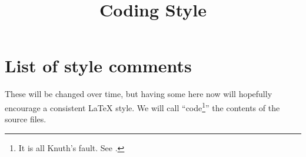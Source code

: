 

%


\title{Coding Style}


\maketitle

\tableofcontents

\section{List of style comments}
\label{section-style}

\noindent
These will be changed over time, but having some here now
will hopefully encourage a consistent LaTeX style.
We will call ``code\footnote{It is all Knuth's fault. See \cite{Knuth}.}''
the contents of the source files.

